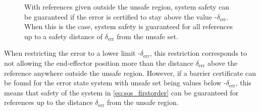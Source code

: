 


\begin{figure}[H]
\centering
{}%
\hspace{3mm}
%
\hspace{3mm}
%
\caption{With references given outside the unsafe region, system safety can be guaranteed if the error is certified to stay above the value -$\delta_\text{err}$. When this is the case, system safety is guaranteed for all references up to a safety distance of $\delta_\text{err}$ from the unsafe set.}
	\label{fig:sets_error}
\end{figure}

When restricting the error to a lower limit -$\delta_\text{err}$, this restriction corresponds to not allowing the end-effector position more than the distance $\delta_\text{err}$ above the reference anywhere outside the unsafe region. However, if a barrier certificate can be found for the error state system with unsafe set being values below -$\delta_\text{err}$, this means that safety of the system in \autoref{eq:sos_firstorder} can be guaranteed for references up to  the distance $\delta_\text{err}$ from the unsafe region.




